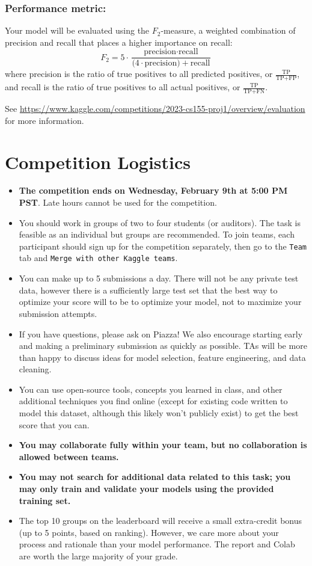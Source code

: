 \subsubsection{Performance metric:}

Your model will be evaluated using the $F_2$-measure, a weighted combination of precision and recall that places a higher importance on recall:
\[F_2 = 5 \cdot \frac{\text{precision} \cdot \text{recall}}{(4 \cdot \text{precision)} + \text{recall}}\]
where precision is the ratio of true positives to all predicted positives, or $\frac{\text{TP}}{\text{TP} + \text{FP}}$, and recall is the ratio of true positives to all actual positives, or $\frac{\text{TP}}{\text{TP} + \text{FN}}$.

See \url{https://www.kaggle.com/competitions/2023-cs155-proj1/overview/evaluation} for more information.

\section{Competition Logistics}

\begin{itemize}
\item \textbf{The competition ends on Wednesday, February 9th at 5:00 PM PST}. Late hours cannot be used for the competition.
\item You should work in groups of two to four students (or auditors). The task is feasible as an individual but groups are recommended. To join teams, each participant should sign up for the competition separately, then go to the \texttt{Team} tab and \texttt{Merge with other Kaggle teams}.
\item You can make up to 5 submissions a day. There will not be any private test data, however there is a sufficiently large test set that the best way to optimize your score will to be to optimize your model, not to maximize your submission attempts.
\item If you have questions, please ask on Piazza! We also encourage starting early and making a preliminary submission as quickly as possible. TAs will be more than happy to discuss ideas for model selection, feature engineering, and data cleaning.
\item You can use open-source tools, concepts you learned in class, and other additional techniques you find online (except for existing code written to model this dataset, although this likely won't publicly exist) to get the best score that you can.
\item \textbf{You may collaborate fully within your team, but no collaboration is allowed between teams.}
\item \textbf{You may not search for additional data related to this task; you may only train and validate your models using the provided training set.}
\item The top 10 groups on the leaderboard will receive a small extra-credit bonus (up to 5 points, based on ranking). However, we care more about your process and rationale than your model performance. The report and Colab are worth the large majority of your grade.
\end{itemize}

